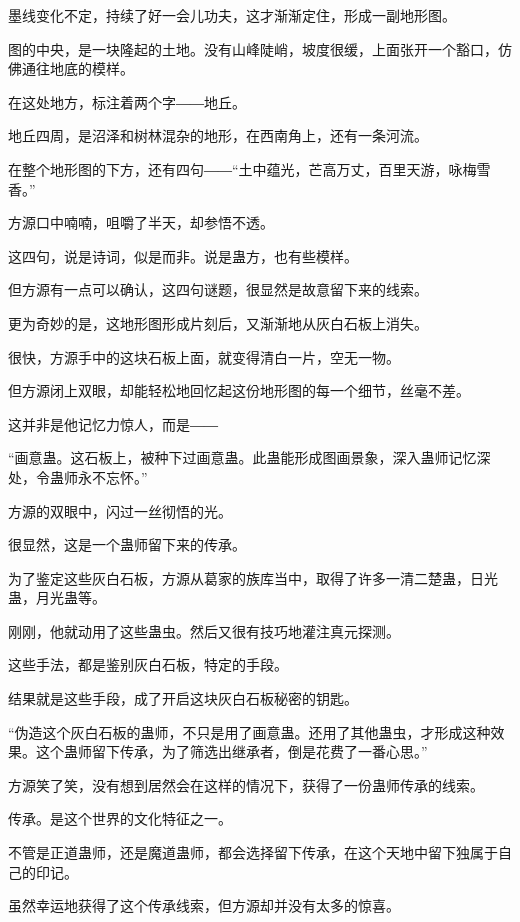 
\begin{this_body}

墨线变化不定，持续了好一会儿功夫，这才渐渐定住，形成一副地形图。

图的中央，是一块隆起的土地。没有山峰陡峭，坡度很缓，上面张开一个豁口，仿佛通往地底的模样。

在这处地方，标注着两个字――地丘。

地丘四周，是沼泽和树林混杂的地形，在西南角上，还有一条河流。

在整个地形图的下方，还有四句――“土中蕴光，芒高万丈，百里天游，咏梅雪香。”

方源口中喃喃，咀嚼了半天，却参悟不透。

这四句，说是诗词，似是而非。说是蛊方，也有些模样。

但方源有一点可以确认，这四句谜题，很显然是故意留下来的线索。

更为奇妙的是，这地形图形成片刻后，又渐渐地从灰白石板上消失。

很快，方源手中的这块石板上面，就变得清白一片，空无一物。

但方源闭上双眼，却能轻松地回忆起这份地形图的每一个细节，丝毫不差。

这并非是他记忆力惊人，而是――

“画意蛊。这石板上，被种下过画意蛊。此蛊能形成图画景象，深入蛊师记忆深处，令蛊师永不忘怀。”

方源的双眼中，闪过一丝彻悟的光。

很显然，这是一个蛊师留下来的传承。

为了鉴定这些灰白石板，方源从葛家的族库当中，取得了许多一清二楚蛊，日光蛊，月光蛊等。

刚刚，他就动用了这些蛊虫。然后又很有技巧地灌注真元探测。

这些手法，都是鉴别灰白石板，特定的手段。

结果就是这些手段，成了开启这块灰白石板秘密的钥匙。

“伪造这个灰白石板的蛊师，不只是用了画意蛊。还用了其他蛊虫，才形成这种效果。这个蛊师留下传承，为了筛选出继承者，倒是花费了一番心思。”

方源笑了笑，没有想到居然会在这样的情况下，获得了一份蛊师传承的线索。

传承。是这个世界的文化特征之一。

不管是正道蛊师，还是魔道蛊师，都会选择留下传承，在这个天地中留下独属于自己的印记。

虽然幸运地获得了这个传承线索，但方源却并没有太多的惊喜。


\end{this_body}
